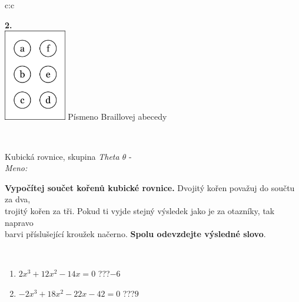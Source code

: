 \documentclass[10pt]{report}
\begin{document}
\begin{tabular}{c:c}
\begin{minipage}[c][104.5mm][t]{0.5\linewidth}
\begin{center}
\begin{minipage}{0.79\linewidth}
\begin{center}
\begin{varwidth}{\linewidth}
\begin{enumerate}
\end{enumerate}
\end{varwidth}
\end{center}
\end{minipage}
\begin{minipage}{0.20\linewidth}
\begin{center}
{\Huge\bfseries 2.} \\[2mm]
\includegraphics[height=40mm]{../images/braille.png}
{\small Písmeno Braillovej abecedy}
\end{center}
\end{minipage}
\end{center}
\end{minipage}
\\ \hdashline
\begin{minipage}[c][104.5mm][t]{0.5\linewidth}
\begin{center}
\vspace{7mm}
{\huge Kubická rovnice, skupina \textit{Theta $\theta$} -}\\[5mm]
\textit{Meno:}\phantom{xxxxxxxxxxxxxxxxxxxxxxxxxxxxxxxxxxxxxxxxxxxxxxxxxxxxxxxxxxxxxxxxx}\\[5mm]
\begin{minipage}{0.95\linewidth}
\textbf{Vypočítej součet kořenů kubické rovnice.} Dvojitý kořen považuj do součtu za dva,\\trojitý kořen za tři. Pokud ti vyjde stejný výsledek jako je za otazníky, tak napravo\\barvi příslušející kroužek načerno. \textbf{Spolu odevzdejte výsledné slovo}.
\end{minipage}
\\[1mm]
\begin{minipage}{0.79\linewidth}
\begin{center}
\begin{varwidth}{\linewidth}
\begin{enumerate}
\Large
\item $2x^3+12x^2-14x=0$\quad \dotfill\; ???\;\dotfill \quad $-6$
\item $-2x^3+18x^2-22x-42=0$\quad \dotfill\; ???\;\dotfill \quad $9$

\end{enumerate}
\end{varwidth}
\end{center}
\end{minipage}
\end{center}
\end{minipage}
\end{tabular}
\end{document}
